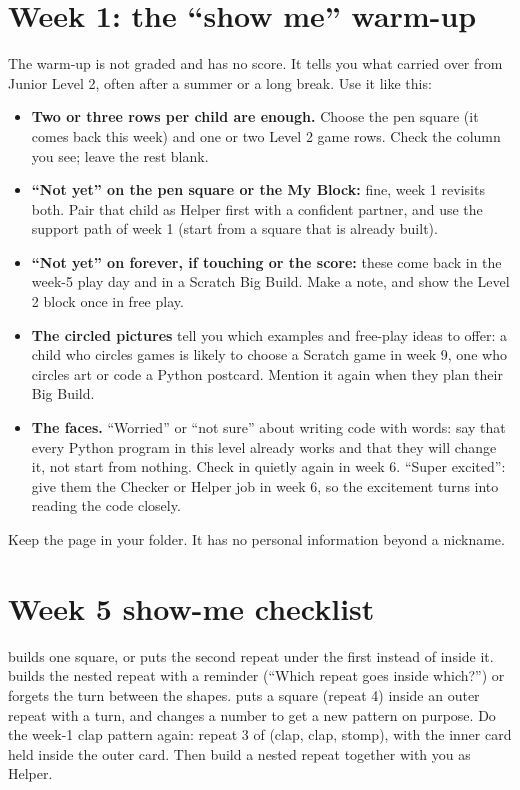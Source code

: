 \section{Week 1: the \enquote{show me} warm-up}
The warm-up is not graded and has no score. It tells you what carried over from Junior Level 2,
often after a summer or a long break. Use it like this:
\begin{itemize}[itemsep=2pt]
  \item \textbf{Two or three rows per child are enough.} Choose the pen square (it comes back this
        week) and one or two Level 2 game rows. Check the column you see; leave the rest blank.
  \item \textbf{\enquote{Not yet} on the pen square or the My Block:} fine, week 1 revisits both. Pair
        that child as Helper first with a confident partner, and use the support path of week 1
        (start from a square that is already built).
  \item \textbf{\enquote{Not yet} on forever, if touching or the score:} these come back in the week-5
        play day and in a Scratch Big Build. Make a note, and show the Level 2 block once in free play.
  \item \textbf{The circled pictures} tell you which examples and free-play ideas to offer: a child who
        circles games is likely to choose a Scratch game in week 9, one who circles art or code a Python
        postcard. Mention it again when they plan their Big Build.
  \item \textbf{The faces.} \enquote{Worried} or \enquote{not sure} about writing code with words: say that
        every Python program in this level already works and that they will change it, not start from
        nothing. Check in quietly again in week 6. \enquote{Super excited}: give them the Checker or Helper
        job in week 6, so the excitement turns into reading the code closely.
\end{itemize}
Keep the page in your folder. It has no personal information beyond a nickname.

\section{Week 5 show-me checklist}

  {builds one square, or puts the second repeat under the first instead of inside it.}
  {builds the nested repeat with a reminder (\enquote{Which repeat goes inside which?}) or forgets the turn between the shapes.}
  {puts a square (repeat 4) inside an outer repeat with a turn, and changes a number to get a new pattern on purpose.}
  {Do the week-1 clap pattern again: repeat 3 of (clap, clap, stomp), with the inner card held inside the outer card. Then build a nested repeat together with you as Helper.}

